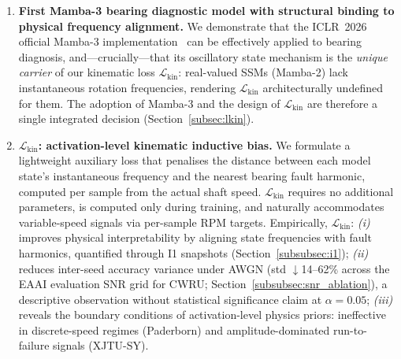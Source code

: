 \begin{enumerate}[leftmargin=*, label=\textbf{C\arabic*}]
  \item \textbf{First Mamba-3 bearing diagnostic model with structural
        binding to physical frequency alignment.}
        We demonstrate that the ICLR~2026 official Mamba-3
        implementation~\cite{mamba3_2026} can be effectively applied to
        bearing diagnosis, and—crucially—that its oscillatory state mechanism
        is the \emph{unique carrier} of our kinematic loss $\mathcal{L}_{\text{kin}}$:
        real-valued SSMs (Mamba-2) lack instantaneous rotation frequencies,
        rendering $\mathcal{L}_{\text{kin}}$ architecturally undefined for them.
        The adoption of Mamba-3 and the design of $\mathcal{L}_{\text{kin}}$ are
        therefore a single integrated decision (Section~\ref{subsec:lkin}).

  \item \textbf{$\mathcal{L}_{\text{kin}}$: activation-level kinematic inductive bias.}
        We formulate a lightweight auxiliary loss that penalises the distance
        between each model state's instantaneous frequency and the nearest
        bearing fault harmonic, computed per sample from the actual shaft
        speed.
        $\mathcal{L}_{\text{kin}}$ requires no additional parameters, is
        computed only during training, and naturally accommodates variable-speed
        signals via per-sample RPM targets.
        Empirically, $\mathcal{L}_{\text{kin}}$:
        \textit{(i)} improves physical interpretability by aligning state
        frequencies with fault harmonics, quantified through I1 snapshots
        (Section~\ref{subsubsec:i1});
        \textit{(ii)} reduces inter-seed accuracy variance under AWGN
        (std $\downarrow$14--62\% across the EAAI evaluation SNR grid
        for CWRU; Section~\ref{subsubsec:snr_ablation}), a descriptive
        observation without statistical significance claim at $\alpha=0.05$;
        \textit{(iii)} reveals the boundary conditions of activation-level
        physics priors: ineffective in discrete-speed regimes (Paderborn) and
        amplitude-dominated run-to-failure signals (XJTU-SY).


\end{enumerate}
